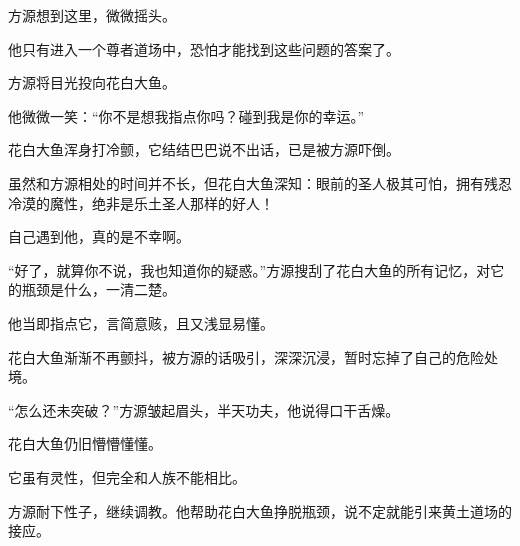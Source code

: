 \begin{this_body}
方源想到这里，微微摇头。

他只有进入一个尊者道场中，恐怕才能找到这些问题的答案了。

方源将目光投向花白大鱼。

他微微一笑：“你不是想我指点你吗？碰到我是你的幸运。”

花白大鱼浑身打冷颤，它结结巴巴说不出话，已是被方源吓倒。

虽然和方源相处的时间并不长，但花白大鱼深知：眼前的圣人极其可怕，拥有残忍冷漠的魔性，绝非是乐土圣人那样的好人！

自己遇到他，真的是不幸啊。

“好了，就算你不说，我也知道你的疑惑。”方源搜刮了花白大鱼的所有记忆，对它的瓶颈是什么，一清二楚。

他当即指点它，言简意赅，且又浅显易懂。

花白大鱼渐渐不再颤抖，被方源的话吸引，深深沉浸，暂时忘掉了自己的危险处境。

“怎么还未突破？”方源皱起眉头，半天功夫，他说得口干舌燥。

花白大鱼仍旧懵懵懂懂。

它虽有灵性，但完全和人族不能相比。

方源耐下性子，继续调教。他帮助花白大鱼挣脱瓶颈，说不定就能引来黄土道场的接应。

\end{this_body}

